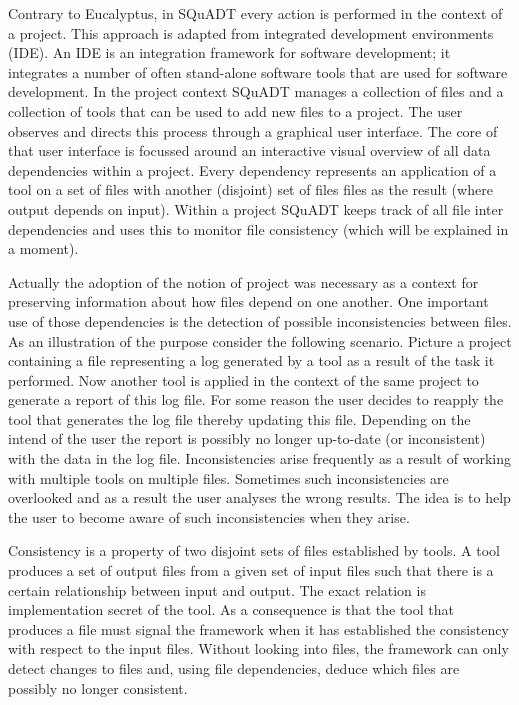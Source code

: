 \documentclass{article}
\newcommand{\squadt}{SQuADT\xspace}
\begin{document}
  Contrary to Eucalyptus, in \squadt every action is performed in the context
  of a project. This approach is adapted from integrated development
  environments (IDE).  An IDE is an integration framework for software
  development; it integrates a number of often stand-alone software tools that
  are used for software development. In the project context \squadt manages a
  collection of files and a collection of tools that can be used to add new
  files to a project. The user observes and directs this process through a
  graphical user interface.  The core of that user interface is focussed around
  an interactive visual overview of all data dependencies within a project.
  Every dependency represents an application of a tool on a set of files with
  another (disjoint) set of files files as the result (where output depends on
  input).  Within a project \squadt keeps track of all file inter dependencies
  and uses this to monitor file consistency (which will be explained in a moment).

  Actually the adoption of the notion of project was necessary as a context for
  preserving information about how files depend on one another. One important
  use of those dependencies is the detection of possible inconsistencies
  between files.  As an illustration of the purpose consider the following
  scenario. Picture a project containing a file representing a log generated by
  a tool as a result of the task it performed. Now another tool is applied in
  the context of the same project to generate a report of this log file. For
  some reason the user decides to reapply the tool that generates the log file
  thereby updating this file.  Depending on the intend of the user the report
  is possibly no longer up-to-date (or inconsistent) with the data in the log
  file. Inconsistencies arise frequently as a result of working with multiple
  tools on multiple files. Sometimes such inconsistencies are overlooked and as
  a result the user analyses the wrong results. The idea is to help the user
  to become aware of such inconsistencies when they arise.

  Consistency is a property of two disjoint sets of files established by tools.
  A tool produces a set of output files from a given set of input files such
  that there is a certain relationship between input and output. The exact
  relation is implementation secret of the tool. As a consequence is that the
  tool that produces a file must signal the framework when it has established
  the consistency with respect to the input files. Without looking into files,
  the framework can only detect changes to files and, using file dependencies,
  deduce which files are possibly no longer consistent.
  
\end{document}
